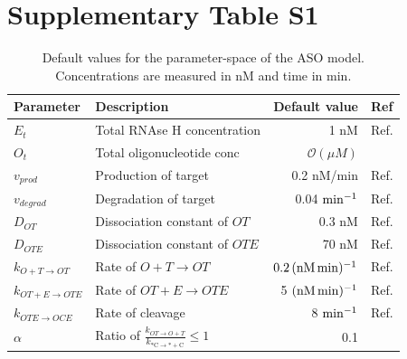 \documentclass[a4paper,11pt]{article}
\begin{document}
\section{Supplementary Table S1}
\begin{table}[!h]
\caption{Default values for the parameter-space of the ASO model. Concentrations are measured in nM and time in min.}\label{tb::par}
\setlength\extrarowheight{5pt}  %
\begin{tabular}{| l | l | r | l |}
\hline
Parameter & Description &Default value & Ref  \\
\hline
$E_t$ & Total RNAse H concentration & 1 nM & Ref. \cite{Amirkhanov:2002vo}\\
$O_t$ & Total oligonucleotide conc & $\mathcal{O}(\mu M )$ & {}\\
$v_{prod}$ & Production of target & 0.2 nM/min & Ref. \cite{lodish2008molecular}\\
$v_{degrad}$ & Degradation of target & 0.04 $\rm{min}^{-1}$ & Ref. \cite{Yang:2003ja}\\
$D_{OT}$ & Dissociation constant of $OT$ & 0.3 nM & Ref. \cite{Christensen:2001te} \\
$D_{OTE}$ & Dissociation constant of $OTE$  & 70 nM & Ref. \cite{Amirkhanov:2002vo} \\
$k_{O+T \to OT }$ & Rate of $O+T \to OT$ & $0.2 \, (\rm{nM \,min})^{-1}$ & Ref. \cite{Christensen:2001te}\\
$k_{OT+E \to OTE}$ & Rate of $OT+E \to OTE$  & 5 $(\rm{nM \,min})^{-1}$ & Ref. \cite{Amirkhanov:2002vo}\\
$k_{OTE \to OCE}$ & Rate of cleavage  & 8 $\rm{min}^{-1}$ & Ref. \cite{Amirkhanov:2002vo}\\
$\alpha$ & Ratio of $\frac{k_{OT \to O+T}}{k_{\mathrm{*C \to *+C}}} \le 1$ & 0.1  & {}\\
\hline
\end{tabular}
\end{table}
\end{document}
